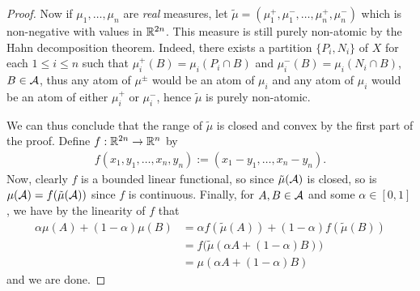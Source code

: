 \documentclass[../../main.tex]{subfiles}
\begin{document}
\begin{proof}
Now if $\mu_{1}, \dots, \mu_{n}$ are \emph{real} measures, let $\tilde{\mu}=(\mu_{1}^{+}, \mu_{1}^{-}, \dots, \mu_{n}^{+}, \mu_{n}^{-})$ which is non-negative with values in $\mathbb{R}^{2n}$. This measure is still purely non-atomic by the Hahn decomposition theorem. Indeed, there exists a partition $\{P_{i}, N_{i}\}$ of $X$ for each $1\le i \le n$ such that $\mu_{i}^{+}(B)=\mu_{i}(P_{i}\cap B)$ and $\mu_{i}^{-}(B)=\mu_{i}(N_{i} \cap B)$, $B\in \mathcal{A}$, thus any atom of $\mu^{\pm}$ would be an atom of $\mu_{i}$ and any atom of $\mu_{i}$ would be an atom of either $\mu_{i}^{+}$ or $\mu_{i}^{-}$, hence $\tilde{\mu}$ is purely non-atomic. 

We can thus conclude that the range of $\tilde{\mu}$ is closed and convex by the first part of the proof. Define $f:\mathbb{R}^{2n} \to \mathbb{R}^{n}$ by
\begin{align*}
	f(x_{1}, y_{1}, \dots, x_{n}, y_{n}):=(x_{1}-y_{1}, \dots, x_{n}-y_{n}).
\end{align*}
Now, clearly $f$ is a bounded linear functional, so since $\tilde{\mu}(\mathcal{A})$ is closed, so is $\mu(\mathcal{A})=f(\tilde{\mu}(\mathcal{A}))$ since $f$ is continuous. Finally, for $A,B\in \mathcal{A}$ and some $\alpha\in [0,1]$, we have by the linearity of $f$ that
\begin{align*}
	\alpha \mu(A)+(1-\alpha)\mu(B)&=\alpha f(\tilde{\mu}(A))+(1-\alpha)f(\tilde{\mu}(B)) \\
	&=f\Big( \tilde{\mu}(\alpha A+(1-\alpha) B)\Big) \\
	&=\mu(\alpha A + (1-\alpha) B)
\end{align*}
and we are done.
\end{proof}
\end{document}
